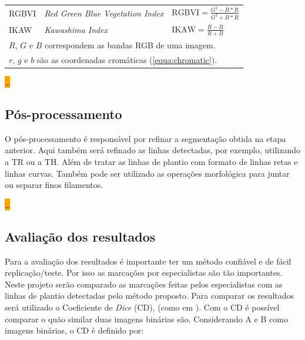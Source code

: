 \documentclass[12pt, a4paper, english, brazil]{article}
\newcommand{\dotsBlue}{\colorbox{orange}{\textcolor{blue}{\dots}}}
\begin{document}
\begin{table}[htb]
\begin{tabular}{@{}lll@{}}
        \multirow{2}{*}{RGBVI} & \multirow{2}{*}{\textit{Red Green Blue Vegetation Index}} & \multirow{2}{*}{$\displaystyle \text{RGBVI} = \frac{G^2 - B * R}{G^2 + B * R}$} \\
        & & \\ \midrule

        \multirow{2}{*}{IKAW} & \multirow{2}{*}{\textit{Kawashima Index}} & \multirow{2}{*}{$\displaystyle \text{IKAW} = \frac{R - B}{R + B}$} \\
        & & \\ \bottomrule

         \multicolumn{3}{l}{$R$, $G$ e $B$ correspondem as bandas RGB de uma imagem.} \\
         \multicolumn{3}{l}{$r$, $g$ e $b$ são as coordenadas cromáticas (\autoref{equa:chromatic}).} \\

    \end{tabular}
\end{table}

\dotsBlue

\subsection{Pós-processamento}

O pós-processamento é responsável por refinar a segmentação obtida na etapa anterior. Aqui também será refinado as linhas detectadas, por exemplo, utilizando a TR ou a TH. Além de tratar as linhas de plantio com formato de linhas retas e linhas curvas. Também pode ser utilizado as operações morfológica para juntar ou separar finos filamentos.

\dotsBlue

\subsection{Avaliação dos resultados}

Para a avaliação dos resultados é importante ter um método confiável e de fácil replicação/teste. Por isso as marcações por especialistas são tão importantes. Neste projeto serão comparado as marcações feitas pelos especialistas com as linhas de plantio detectadas pelo método proposto. Para comparar os resultados será utilizado o Coeficiente de \textit{Dice} (CD), (como em ). Com o CD é possível comparar o quão similar duas imagens binárias são. Considerando A e B como imagens binárias, o CD é definido por:
\end{document}
